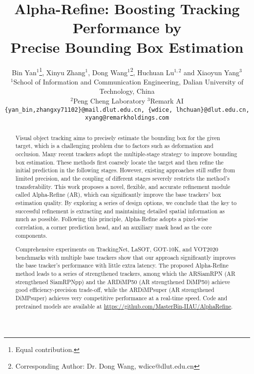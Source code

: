 \documentclass[final]{cvpr}
\newcommand{\ignore}[1]{}
\begin{document}
\title{Alpha-Refine: Boosting Tracking Performance by \\ Precise Bounding Box Estimation}

\author{
Bin Yan$^{1}$\thanks{Equal contribution.}, Xinyu Zhang$^{1}$\footnotemark[1], Dong Wang$^{1}$\thanks{Corresponding Author: Dr. Dong Wang, wdice@dlut.edu.cn},  Huchuan Lu$^{1,2}$ and Xiaoyun Yang$^3$\\
$^1$School of Information and Communication Engineering, Dalian University of Technology, China\\
$^2$Peng Cheng Laboratory
$^3$Remark AI\\
{\tt\footnotesize \{yan\_bin,zhangxy71102\}@mail.dlut.edu.cn, 
\{wdice, lhchuan\}@dlut.edu.cn, xyang@remarkholdings.com}
}



\maketitle
\pagestyle{empty}
\thispagestyle{empty}


\begin{abstract}
Visual object tracking aims to precisely estimate the bounding box for the given target, which is a challenging problem due to factors such as deformation and occlusion. Many recent trackers adopt the multiple-stage 
strategy to improve bounding box estimation. These methods first coarsely locate the target and then 
refine the initial prediction in the following stages. However, existing approaches still suffer from limited precision, 
and the coupling of different stages severely restricts the method’s transferability. This work proposes a novel, 
flexible, and accurate refinement module called Alpha-Refine (AR), which can significantly improve the base trackers’ 
box estimation quality. By exploring a series of design options, we conclude that the key to successful refinement is 
extracting and maintaining detailed spatial information as much as possible. Following this principle, Alpha-Refine 
adopts a pixel-wise correlation, a corner prediction head, and an auxiliary mask head as the core components. 
\ignore{We apply Alpha-Refine to six famous base trackers to verify our method’s effectiveness: ECO, RT-MDNet, SiamRPNpp, ATOM, DiMP50, and DiMPsuper.}
Comprehensive experiments on TrackingNet, LaSOT, GOT-10K, and VOT2020 benchmarks with multiple base trackers show that our approach significantly improves the base tracker’s performance with little extra latency. 
The proposed Alpha-Refine method leads to a series of strengthened trackers, among which the ARSiamRPN (AR strengthened SiamRPNpp) and the ARDiMP50 (AR strengthened DiMP50) achieve good efficiency-precision trade-off, while the ARDiMPsuper (AR strengthened DiMPsuper) achieves very competitive performance at a real-time speed.
Code and pretrained models are available at \href{https://github.com/MasterBin-IIAU/AlphaRefine} {https://github.com/MasterBin-IIAU/AlphaRefine}.
\end{abstract}
\end{document}
